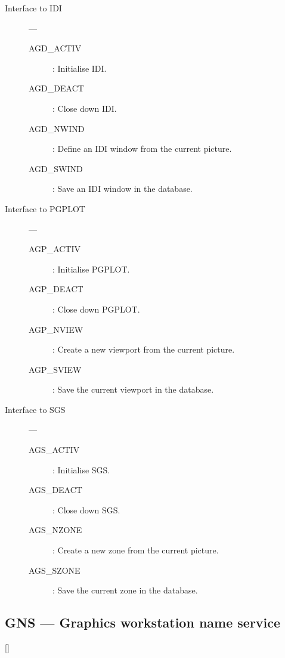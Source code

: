 \begin{description}
\item [Interface to IDI] ---

\begin{description}
\item [AGD\_ACTIV] : Initialise IDI.
\item [AGD\_DEACT] : Close down IDI.
\item [AGD\_NWIND] : Define an IDI window from the current picture.
\item [AGD\_SWIND] : Save an IDI window in the database.
\end{description}

\item [Interface to PGPLOT] ---

\begin{description}
\item [AGP\_ACTIV] : Initialise PGPLOT.
\item [AGP\_DEACT] : Close down PGPLOT.
\item [AGP\_NVIEW] : Create a new viewport from the current picture.
\item [AGP\_SVIEW] : Save the current viewport in the database.
\end{description}

\item [Interface to SGS] ---

\begin{description}
\item [AGS\_ACTIV] : Initialise SGS.
\item [AGS\_DEACT] : Close down SGS.
\item [AGS\_NZONE] : Create a new zone from the current picture.
\item [AGS\_SZONE] : Save the current zone in the database.
\end{description}

\end{description}

\newpage

\subsection{GNS --- Graphics workstation name service}

\vspace{-9mm}

\hfill []

\vspace{2mm}

